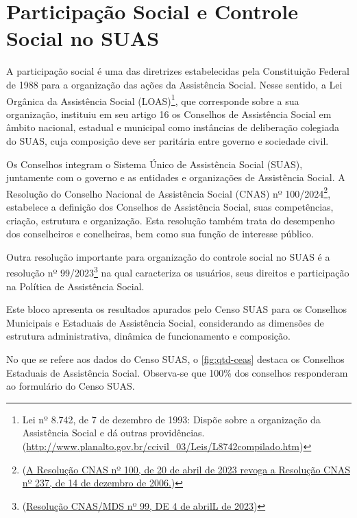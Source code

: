 \documentclass[
  brazilian]{report}
\begin{document}
\hypertarget{participauxe7uxe3o-social-e-controle-social-no-suas}{%
\chapter{Participação Social e Controle Social no
SUAS}\label{participauxe7uxe3o-social-e-controle-social-no-suas}}

A participação social é uma das diretrizes estabelecidas pela
Constituição Federal de 1988 para a organização das ações da Assistência
Social. Nesse sentido, a Lei Orgânica da Assistência Social
(LOAS)\footnote{Lei nº 8.742, de 7 de dezembro de 1993: Dispõe sobre a organização da Assistência Social e dá outras providências. (\url{http://www.planalto.gov.br/ccivil_03/Leis/L8742compilado.htm})},
que corresponde sobre a sua organização, instituiu em seu artigo 16 os
Conselhos de Assistência Social em âmbito nacional, estadual e municipal
como instâncias de deliberação colegiada do SUAS, cuja composição deve
ser paritária entre governo e sociedade civil.

Os Conselhos integram o Sistema Único de Assistência Social (SUAS),
juntamente com o governo e as entidades e organizações de Assistência
Social. A Resolução do Conselho Nacional de Assistência Social (CNAS) nº
100/2024\footnote{(\url{A Resolução CNAS nº 100, de 20 de abril de 2023 revoga a Resolução CNAS nº 237, de 14 de dezembro de 2006.})},
estabelece a definição dos Conselhos de Assistência Social, suas
competências, criação, estrutura e organização. Esta resolução também
trata do desempenho dos conselheiros e conelheiras, bem como sua função
de interesse público.

Outra resolução importante para organização do controle social no SUAS é
a resolução nº
99/2023\footnote{(\url{Resolução CNAS/MDS nº 99, DE 4 de abrilL de 2023})}
na qual caracteriza os usuários, seus direitos e participação na
Política de Assistência Social.

Este bloco apresenta os resultados apurados pelo Censo SUAS para os
Conselhos Municipais e Estaduais de Assistência Social, considerando as
dimensões de estrutura administrativa, dinâmica de funcionamento e
composição.

No que se refere aos dados do Censo SUAS, o \cref{fig:qtd-ceas} destaca
os Conselhos Estaduais de Assistência Social. Observa-se que 100\% dos
conselhos responderam ao formulário do Censo SUAS.
\end{document}
